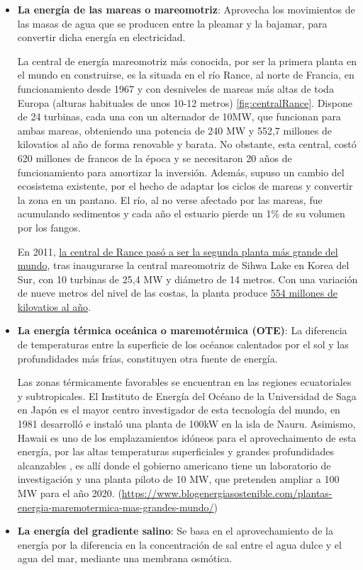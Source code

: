 \begin{itemize}
\item
  \textbf{La energía de las mareas o mareomotriz}: Aprovecha los
  movimientos de las masas de agua que se producen entre la pleamar y la
  bajamar, para convertir dicha energía en electricidad.

  La central de energía mareomotriz más conocida, por ser la primera
  planta en el mundo en construirse, es la situada en el río Rance, al
  norte de Francia, en funcionamiento desde 1967 y con desniveles de
  mareas más altas de toda Europa (alturas habituales de unos 10-12
  metros) \autoref{fig:centralRance}. Dispone de 24 turbinas, cada una con un alternador de 10MW,
  que funcionan para ambas mareas, obteniendo una potencia de 240 MW y
  552,7 millones de kilovatios al año de forma renovable y barata. No
  obstante, esta central, costó 620 millones de francos de la época y se
  necesitaron 20 años de funcionamiento para amortizar la inversión.
  Además, supuso un cambio del ecosistema existente, por el hecho de
  adaptar los ciclos de mareas y convertir la zona en un pantano. El
  río, al no verse afectado por las mareas, fue acumulando sedimentos y
  cada año el estuario pierde un 1\% de su volumen por los fangos.



  En 2011,
  \href{https://www.blogenergiasostenible.com/central-energia-mareomotriz-rance-mas-grande-mundo/}{la
  central de Rance pasó a ser la segunda planta más grande del mundo},
  tras inaugurarse la central mareomotriz de Sihwa Lake en Korea del
  Sur, con 10 turbinas de 25,4 MW y diámetro de 14 metros. Con una
  variación de nueve metros del nivel de las costas, la planta produce
  \href{http://world.kbs.co.kr/spanish/archive/program/news_issue.htm?no=22473}{554
  millones de kilovatios al año}.
\item
  \textbf{La energía térmica oceánica o maremotérmica (OTE)}: La
  diferencia de temperaturas entre la superficie de los océanos
  calentados por el sol y las profundidades más frías, constituyen otra
  fuente de energía.

  Las zonas térmicamente favorables se encuentran en las regiones
  ecuatoriales y subtropicales. El Instituto de Energía del Océano de la
  Universidad de Saga en Japón es el mayor centro investigador de esta
  tecnología del mundo, en 1981 desarrolló e instaló una planta de 100kW
  en la isla de Nauru. Asimismo, Hawaii es uno de los emplazamientos
  idóneos para el aprovechaimento de esta energía, por las altas
  temperaturas superficiales y grandes profundidades alcanzables , es
  allí donde el gobierno americano tiene un laboratorio de investigación
  y una planta piloto de 10 MW, que pretenden ampliar a 100 MW para el
  año 2020.
  (\url{https://www.blogenergiasostenible.com/plantas-energia-maremotermica-mas-grandes-mundo/})
\item
  \textbf{La energía del gradiente salino}: Se basa en el
  aprovechamiento de la energía por la diferencia en la concentración de
  sal entre el agua dulce y el agua del mar, mediante una membrana
  osmótica.


\end{itemize}
